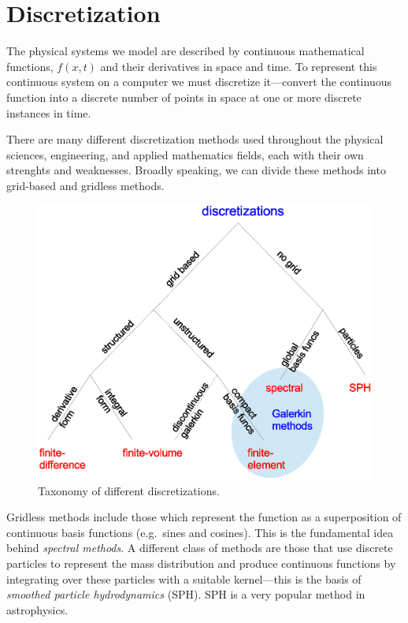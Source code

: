 \section{Discretization}

The physical systems we model are described by continuous mathematical
functions, $f(x,t)$ and their derivatives in space and time.  To
represent this continuous system on a computer we must discretize
it---convert the continuous function into a discrete number of points
in space at one or more discrete instances in time.

There are many different discretization methods used throughout the
physical sciences, engineering, and applied mathematics fields, each
with their own strenghts and weaknesses.  Broadly speaking, we can
divide these methods into grid-based and gridless methods.  

\begin{figure}[h]
\centering
\includegraphics[width=6in]{discretizations}
\caption{\label{fig:disc} Taxonomy of different discretizations.}
\end{figure}

Gridless methods include those which represent the function as a
superposition of continuous basis functions (e.g.\ sines and cosines).
This is the fundamental idea behind {\em spectral methods}.  A different
class of methods are those that use discrete particles to represent the
mass distribution and produce continuous functions by integrating
over these particles with a suitable kernel---this is the basis of
{\em smoothed particle hydrodynamics} (SPH).  SPH is a very popular
method in astrophysics.

